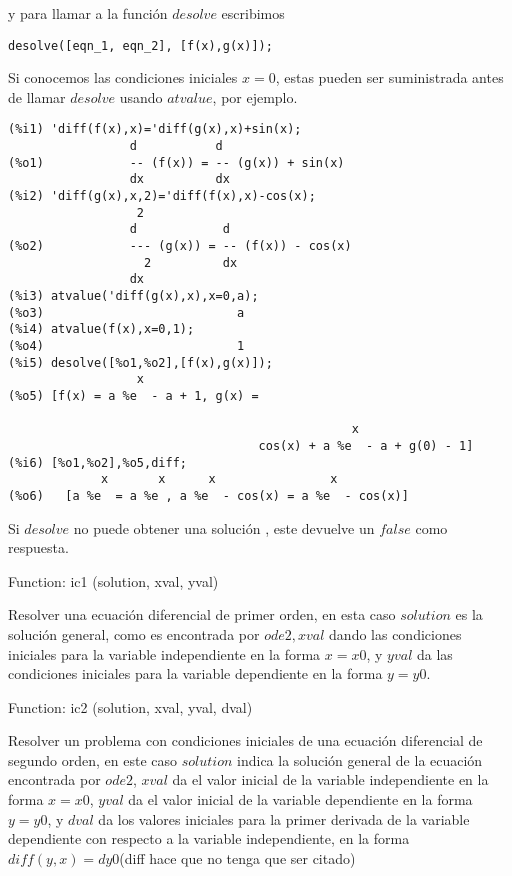 \documentclass[12pt]{article}
\begin{document}
y para llamar a la función $desolve$ escribimos

\begin{verbatim}
desolve([eqn_1, eqn_2], [f(x),g(x)]);
\end{verbatim}

Si conocemos las condiciones iniciales $x=0$, estas pueden ser suministrada antes de llamar $desolve$ usando $atvalue$, por ejemplo.

\begin{verbatim}
(%i1) 'diff(f(x),x)='diff(g(x),x)+sin(x);
                 d           d
(%o1)            -- (f(x)) = -- (g(x)) + sin(x)
                 dx          dx
(%i2) 'diff(g(x),x,2)='diff(f(x),x)-cos(x);
                  2
                 d            d
(%o2)            --- (g(x)) = -- (f(x)) - cos(x)
                   2          dx
                 dx
(%i3) atvalue('diff(g(x),x),x=0,a);
(%o3)                           a
(%i4) atvalue(f(x),x=0,1);
(%o4)                           1
(%i5) desolve([%o1,%o2],[f(x),g(x)]);
                  x
(%o5) [f(x) = a %e  - a + 1, g(x) =

                                                x
                                   cos(x) + a %e  - a + g(0) - 1]
(%i6) [%o1,%o2],%o5,diff;
             x       x      x                x
(%o6)   [a %e  = a %e , a %e  - cos(x) = a %e  - cos(x)]
\end{verbatim}

Si $desolve$ no puede obtener una solución , este devuelve un $false$ como respuesta.

Function: ic1 (solution, xval, yval)

Resolver una ecuación diferencial de primer orden, en esta caso $solution$ es la solución general, como es encontrada por $ode2, xval$ dando las condiciones iniciales para la variable independiente en la forma $x= x0$, y $yval$ da las condiciones iniciales para la variable dependiente en la forma $y= y0$.

Function: ic2 (solution, xval, yval, dval)

Resolver un problema con condiciones iniciales de una ecuación diferencial de segundo orden, en este caso $solution$ indica la solución general de la ecuación encontrada por $ode2$, $xval$ da el valor inicial de la variable independiente en la forma $x= x0$, $yval$ da el valor inicial de la variable dependiente en la forma $y= y0$, y $dval$ da los valores iniciales para la primer derivada de la variable dependiente con respecto a la variable independiente, en la forma $diff(y,x)= dy0$(diff hace que no tenga que ser citado)
\end{document}
